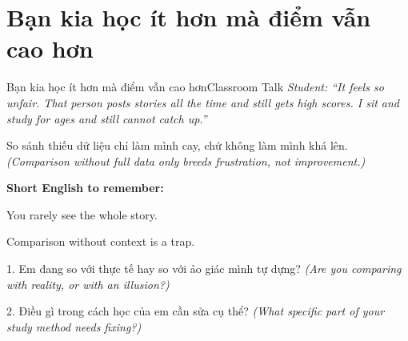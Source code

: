 \section{Bạn kia học ít hơn mà điểm vẫn cao hơn}
\begin{truyen}{Bạn kia học ít hơn mà điểm vẫn cao hơn}{Classroom Talk}
\textit{Student: ``It feels so unfair. That person posts stories all the time and still gets high scores. I sit and study for ages and still cannot catch up.''}\\[4pt]



\end{truyen}

\begin{baihoc}
So sánh thiếu dữ liệu chỉ làm mình cay, chứ không làm mình khá lên.
\textit{(Comparison without full data only breeds frustration, not improvement.)}
\end{baihoc}

\begin{ghinhoanh}
\textbf{Short English to remember:}

You rarely see the whole story.

Comparison without context is a trap.
\end{ghinhoanh}

\begin{tuhocnhanh}
1. Em đang so với thực tế hay so với ảo giác mình tự dựng? \textit{(Are you comparing with reality, or with an illusion?)}

2. Điều gì trong cách học của em cần sửa cụ thể? \textit{(What specific part of your study method needs fixing?)}
\end{tuhocnhanh}
\ngancach

